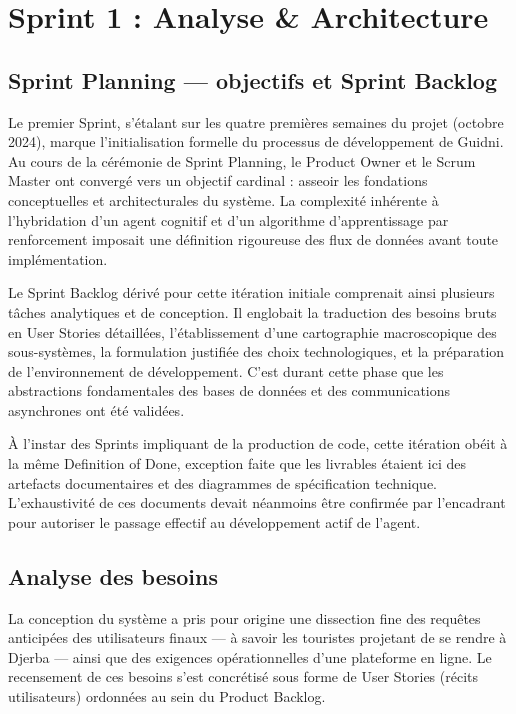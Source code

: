 \chapter{Sprint 1 : Analyse \& Architecture}

\section{Sprint Planning — objectifs et Sprint Backlog}

Le premier Sprint, s'étalant sur les quatre premières semaines du projet (octobre 2024), marque l'initialisation formelle du processus de développement de Guidni. Au cours de la cérémonie de Sprint Planning, le Product Owner et le Scrum Master ont convergé vers un objectif cardinal : asseoir les fondations conceptuelles et architecturales du système. La complexité inhérente à l'hybridation d'un agent cognitif et d'un algorithme d'apprentissage par renforcement imposait une définition rigoureuse des flux de données avant toute implémentation. 

Le Sprint Backlog dérivé pour cette itération initiale comprenait ainsi plusieurs tâches analytiques et de conception. Il englobait la traduction des besoins bruts en User Stories détaillées, l'établissement d'une cartographie macroscopique des sous-systèmes, la formulation justifiée des choix technologiques, et la préparation de l'environnement de développement. C'est durant cette phase que les abstractions fondamentales des bases de données et des communications asynchrones ont été validées.

À l'instar des Sprints impliquant de la production de code, cette itération obéit à la même Definition of Done, exception faite que les livrables étaient ici des artefacts documentaires et des diagrammes de spécification technique. L'exhaustivité de ces documents devait néanmoins être confirmée par l'encadrant pour autoriser le passage effectif au développement actif de l'agent.

\section{Analyse des besoins}

La conception du système a pris pour origine une dissection fine des requêtes anticipées des utilisateurs finaux — à savoir les touristes projetant de se rendre à Djerba — ainsi que des exigences opérationnelles d'une plateforme en ligne. Le recensement de ces besoins s'est concrétisé sous forme de User Stories (récits utilisateurs) ordonnées au sein du Product Backlog.

